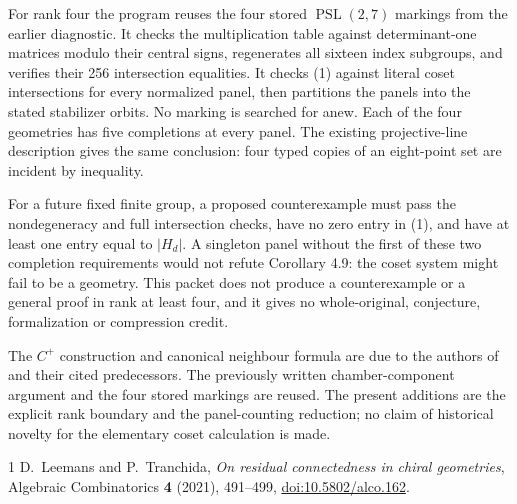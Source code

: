 \documentclass[11pt]{article}
\begin{document}
For rank four the program reuses the four stored $\operatorname{PSL}(2,7)$
markings from the earlier diagnostic. It checks the multiplication
table against determinant-one matrices modulo their central signs,
regenerates all sixteen index subgroups, and verifies their 256
intersection equalities. It checks (1) against literal coset
intersections for every normalized panel, then partitions the panels
into the stated stabilizer orbits. No marking is searched for anew.
Each of the four geometries has five completions at every panel.
The existing projective-line description gives the same conclusion:
four typed copies of an eight-point set are incident by inequality.

For a future fixed finite group, a proposed counterexample must pass
the nondegeneracy and full intersection checks, have no zero entry in
(1), and have at least one entry equal to $|H_d|$. A singleton panel
without the first of these two completion requirements would not
refute Corollary 4.9: the coset system might fail to be a geometry.
This packet does not produce a counterexample or a general proof in
rank at least four, and it gives no whole-original, conjecture,
formalization or compression credit.

The $C^+$ construction and canonical neighbour formula are due to the
authors of \cite{LT} and their cited predecessors. The previously
written chamber-component argument and the four stored markings are
reused. The present additions are the explicit rank boundary and the
panel-counting reduction; no claim of historical novelty for the
elementary coset calculation is made.

\begin{thebibliography}{1}
 D.~Leemans and P.~Tranchida,
\emph{On residual connectedness in chiral geometries},
Algebraic Combinatorics \textbf{4} (2021), 491--499,
\href{https://doi.org/10.5802/alco.162}{doi:10.5802/alco.162}.
\end{thebibliography}
\end{document}
